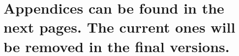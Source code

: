 \documentclass[main.tex]{subfiles}
\begin{document}
    \appendix
    \section{Appendices can be found in the next pages. The current ones will be removed in the final versions.}
    
    
\end{document}
